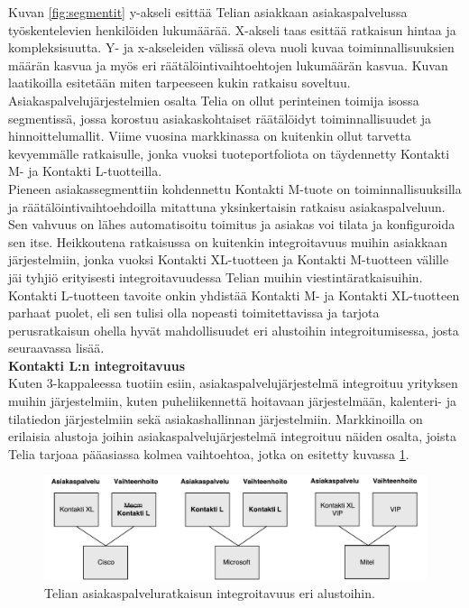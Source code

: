 \documentclass[finnish,12pt,a4paper,pdftex]{article}
\begin{document}
Kuvan \ref{fig:segmentit} y-akseli esittää Telian asiakkaan asiakaspalvelussa työskentelevien henkilöiden lukumäärää. X-akseli taas esittää ratkaisun hintaa ja kompleksisuutta. Y- ja x-akseleiden välissä oleva nuoli kuvaa toiminnallisuuksien määrän kasvua ja myös eri räätälöintivaihtoehtojen lukumäärän kasvua. Kuvan laatikoilla esitetään miten tarpeeseen kukin ratkaisu soveltuu.\\

Asiakaspalvelujärjestelmien osalta Telia on ollut perinteinen toimija isossa segmentissä, jossa korostuu asiakaskohtaiset räätälöidyt toiminnallisuudet ja hinnoittelumallit. Viime vuosina markkinassa on kuitenkin ollut tarvetta kevyemmälle ratkaisulle, jonka vuoksi tuoteportfoliota on täydennetty Kontakti M- ja Kontakti L-tuotteilla.\\

Pieneen asiakassegmenttiin kohdennettu Kontakti M-tuote on toiminnallisuuksilla ja räätälöintivaihtoehdoilla mitattuna yksinkertaisin ratkaisu asiakaspalveluun. Sen vahvuus on lähes automatisoitu toimitus ja asiakas voi tilata ja konfiguroida sen itse. Heikkoutena ratkaisussa on kuitenkin integroitavuus muihin asiakkaan järjestelmiin, jonka vuoksi Kontakti XL-tuotteen ja Kontakti M-tuotteen välille jäi tyhjiö erityisesti integroitavuudessa Telian muihin viestintäratkaisuihin.\\

Kontakti L-tuotteen tavoite onkin yhdistää Kontakti M- ja Kontakti XL-tuotteen parhaat puolet, eli sen tulisi olla nopeasti toimitettavissa ja tarjota perusratkaisun ohella hyvät mahdollisuudet eri alustoihin integroitumisessa, josta seuraavassa lisää.\\

\textbf{Kontakti L:n integroitavuus}\\

Kuten 3-kappaleessa tuotiin esiin, asiakaspalvelujärjestelmä integroituu yrityksen muihin järjestelmiin, kuten puheliikennettä hoitavaan järjestelmään, kalenteri- ja tilatiedon järjestelmiin sekä asiakashallinnan järjestelmiin. Markkinoilla on erilaisia alustoja joihin asiakaspalvelujärjestelmä integroituu näiden osalta, joista Telia tarjoaa pääasiassa kolmea vaihtoehtoa, jotka on esitetty kuvassa \ref{fig:palvelumal}.\\

\begin{figure}[!h]
    \centering
    \includegraphics[scale=0.5]{images/palvelumalli.pdf}
    \caption{Telian asiakaspalveluratkaisun integroitavuus eri alustoihin.}
    \label{fig:palvelumal}
\end{figure}
\end{document}
